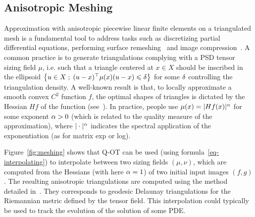 

\subsection{Anisotropic Meshing}

Approximation with anisotropic piecewise linear finite elements on a triangulated mesh is a fundamental tool to address tasks such as discretizing partial differential equations, performing surface remeshing~\cite{alliez2003anisotropic} and image compression~\cite{demaret2006image}.
%
A common practice is to generate triangulations complying with a PSD tensor sizing field $\mu$, i.e. such that a triangle centered at $x \in X$ should be inscribed in the ellipsoid $\left\{ u \in X \;;\; (u-x)^\top \mu(x) (u-x) \leqslant \delta  \right\}$ for some $\delta$ controlling the triangulation density. 
%
A well-known result is that, to locally approximate a smooth convex $C^2$ function $f$,  the optimal shapes of triangles is dictated by the Hessian $H f$ of the function (see~\cite{shewchuk2002good}). In practice, people use $\mu(x) = |H f(x)|^\alpha$ for some exponent $\alpha > 0$ (which is related to the quality measure of the approximation), where $|\cdot|^\alpha$ indicates the spectral application of the exponentiation (as for matrix exp or log).

Figure~\ref{fig:meshing} shows that Q-OT can be used (using formula~\eqref{eq-interpolating}) to interpolate between two sizing fields $(\mu,\nu)$, which are computed from the Hessians (with here $\alpha=1$) of two initial input images $(f,g)$.
%
The resulting anisotropic triangulations are computed using the method detailed in~\cite{peyre-iccv-09}. They corresponds to geodesic Delaunay triangulations for the Riemannian metric defined by the tensor field. 
%
This interpolation could typically be used to track the evolution of the solution of some PDE. 

